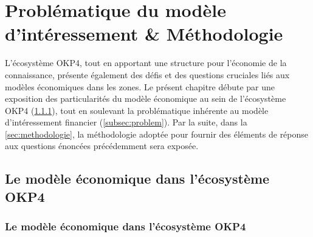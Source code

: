 \chapter{Problématique du modèle d'intéressement \& Méthodologie}\label{chap:chapiter3}


L'écosystème OKP4, tout en apportant une structure pour l'économie de la connaissance, présente également des défis et des questions cruciales liés aux modèles économiques dans les zones. Le présent chapitre débute par une exposition des particularités du modèle économique au sein de l'écosystème OKP4 (\ref{subsec:modele_eco}), tout en soulevant la problématique inhérente au modèle d'intéressement financier (\ref{subsec:problem}). Par la suite, dans la \autoref{sec:methodologie}, la méthodologie adoptée pour fournir des éléments de réponse aux questions énoncées précédemment sera exposée.

\section{Le modèle économique dans l'écosystème OKP4}\label{sec:modele_eco}

\subsection{Le modèle économique dans l'écosystème OKP4}\label{subsec:modele_eco}

